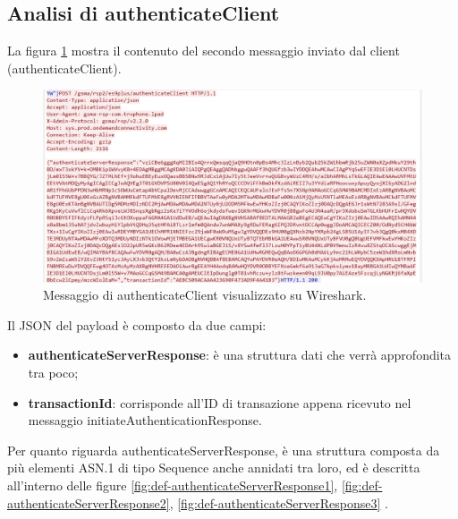 \documentclass[10pt, oneside]{book}
\begin{document}
\subsection{Analisi di authenticateClient}
La figura \ref{fig:msg3-stream-pcap} mostra il contenuto del secondo messaggio inviato dal client (authenticateClient).\\
\begin{figure}
\includegraphics[width=\linewidth]{msg3-stream-pcap.png}
\caption{Messaggio di authenticateClient visualizzato su Wireshark.}
\label{fig:msg3-stream-pcap}
\end{figure}
Il JSON del payload è composto da due campi:
\begin{itemize}
\item \textbf{authenticateServerResponse}: è una struttura dati che verrà approfondita tra poco;
\item \textbf{transactionId}: corrisponde all'ID di transazione appena ricevuto nel messaggio initiateAuthenticationResponse.
\end{itemize}
Per quanto riguarda authenticateServerResponse, è una struttura composta da più elementi ASN.1 di tipo Sequence anche annidati tra loro, ed è descritta all'interno delle figure \ref{fig:def-authenticateServerResponse1}, \ref{fig:def-authenticateServerResponse2}, \ref{fig:def-authenticateServerResponse3} \cite{RSP-definitions}.\\
\end{document}
